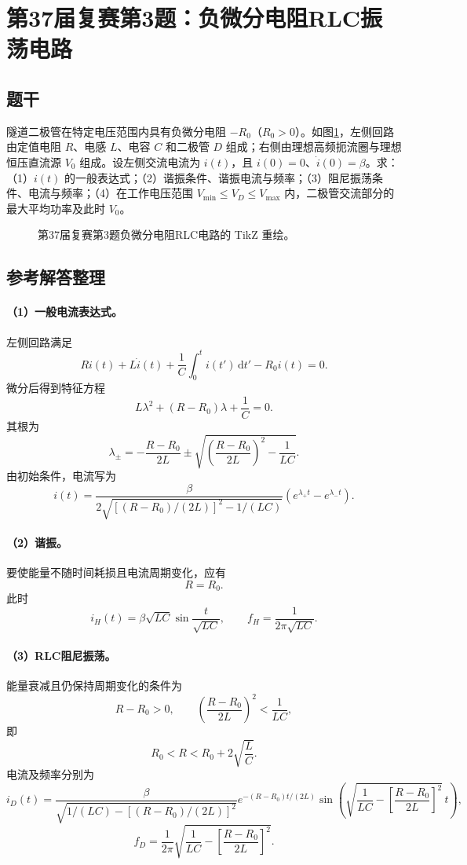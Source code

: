 \section{第37届复赛第3题：负微分电阻RLC振荡电路}
\subsection{题干}
隧道二极管在特定电压范围内具有负微分电阻 $-R_0$（$R_0>0$）。如图\ref{fig:cpho37q03}，左侧回路由定值电阻 $R$、电感 $L$、电容 $C$ 和二极管 $D$ 组成；右侧由理想高频扼流圈与理想恒压直流源 $V_0$ 组成。设左侧交流电流为 $i(t)$，且 $i(0)=0$、$\dot i(0)=\beta$。求：（1）$i(t)$ 的一般表达式；（2）谐振条件、谐振电流与频率；（3）阻尼振荡条件、电流与频率；（4）在工作电压范围 $V_{\min}\le V_D\le V_{\max}$ 内，二极管交流部分的最大平均功率及此时 $V_0$。
\begin{figure}[htbp]\centering

\caption{第37届复赛第3题负微分电阻RLC电路的 TikZ 重绘。}\label{fig:cpho37q03}
\end{figure}

\subsection{参考解答整理}
\paragraph{（1）一般电流表达式。} 左侧回路满足
\[
Ri(t)+L\dot i(t)+\frac1C\int_0^t i(t')\,\mathrm dt'-R_0i(t)=0.
\]
微分后得到特征方程
\[
L\lambda^2+(R-R_0)\lambda+\frac1C=0.
\]
其根为
\[
\lambda_\pm=-\frac{R-R_0}{2L}
\pm\sqrt{\left(\frac{R-R_0}{2L}\right)^2-\frac1{LC}}.
\]
由初始条件，电流写为
\[
\boxed{i(t)=\frac{\beta}{2\sqrt{\left[(R-R_0)/(2L)\right]^2-1/(LC)}}
\left(e^{\lambda_+t}-e^{\lambda_-t}\right).}
\]

\paragraph{（2）谐振。} 要使能量不随时间耗损且电流周期变化，应有
\[
R=R_0.
\]
此时
\[
\boxed{i_H(t)=\beta\sqrt{LC}\sin\frac{t}{\sqrt{LC}},
\qquad f_H=\frac1{2\pi\sqrt{LC}}.}
\]

\paragraph{（3）RLC阻尼振荡。} 能量衰减且仍保持周期变化的条件为
\[
R-R_0>0,
\qquad
\left(\frac{R-R_0}{2L}\right)^2<\frac1{LC},
\]
即
\[
\boxed{R_0<R<R_0+2\sqrt{\frac LC}.}
\]
电流及频率分别为
\[
\boxed{i_D(t)=\frac{\beta}{\sqrt{1/(LC)-[(R-R_0)/(2L)]^2}}
e^{-(R-R_0)t/(2L)}
\sin\left(\sqrt{\frac1{LC}-\left[\frac{R-R_0}{2L}\right]^2}\,t\right),}
\]
\[
\boxed{f_D=\frac1{2\pi}\sqrt{\frac1{LC}-\left[\frac{R-R_0}{2L}\right]^2}.}
\]

